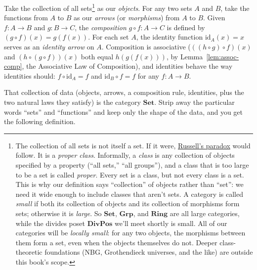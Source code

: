 Take the collection of all sets\footnote{The collection of all sets is not itself a
set. If it were, \href{https://en.wikipedia.org/wiki/Russell\%27s_paradox}{Russell's
paradox} would follow. It is a \textit{proper class}. Informally, a \textit{class} is
any collection of objects specified by a property (``all sets,'' ``all groups''), and a
class that is too large to be a set is called \textit{proper}. Every set is a class,
but not every class is a set. This is why our definition says ``collection'' of
objects rather than ``set'': we need it wide enough to include classes that aren't
sets. A category is called \textit{small} if both its collection of objects
and its collection of morphisms form sets; otherwise it is \textit{large}. So
$\mathbf{Set}$, $\mathbf{Grp}$, and $\mathbf{Ring}$ are all large categories, while
the divides poset $\mathbf{DivPos}$ we'll meet shortly is small. All of our categories will be \textit{locally small}: for
any two objects, the morphisms between them form a set, even when the objects
themselves do not. Deeper class-theoretic foundations (NBG, Grothendieck universes,
and the like) are outside this book's scope.} as our \textit{objects}. For any two sets $A$ and $B$,
take the functions from $A$ to $B$ as our \textit{arrows} (or \textit{morphisms}) from
$A$ to $B$. Given $f : A \to B$ and $g : B \to C$, the \textit{composition}
$g \circ f : A \to C$ is defined by $(g \circ f)(x) = g(f(x))$. For each set $A$, the
identity function $\mathrm{id}_A(x) = x$ serves as an \textit{identity arrow} on $A$.
Composition is associative ($((h \circ g) \circ f)(x)$ and $(h \circ (g \circ f))(x)$
both equal $h(g(f(x)))$, by Lemma~\ref{lem:assoc-comp}, the Associative Law of
Composition), and identities behave the way identities should:
$f \circ \mathrm{id}_A = f$ and $\mathrm{id}_B \circ f = f$ for any $f : A \to B$.

That collection of data (objects, arrows, a composition rule, identities, plus the two
natural laws they satisfy) is the category $\mathbf{Set}$. Strip away the particular
words ``sets'' and ``functions'' and keep only the shape of the data, and you get the
following definition.

